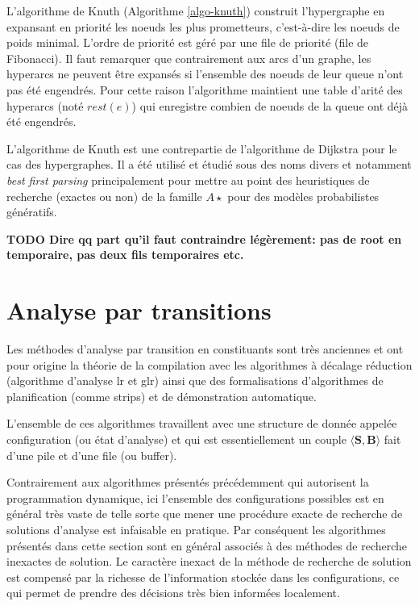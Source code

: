 \documentclass[11pt,openany]{book}
\begin{document}
L'algorithme de Knuth (Algorithme \ref{algo-knuth}) construit l'hypergraphe en expansant en priorité 
les noeuds les plus prometteurs, c'est-à-dire les noeuds de poids minimal.
L'ordre de priorité est géré par une file de priorité (file de Fibonacci).
Il faut remarquer que contrairement aux arcs d'un graphe, les hyperarcs ne peuvent être expansés 
si l'ensemble des noeuds de leur queue n'ont pas été engendrés. Pour cette raison l'algorithme maintient une table d'arité des hyperarcs
(noté $rest(e)$) qui enregistre combien de noeuds de la queue ont déjà été engendrés.

L'algorithme de Knuth est une contrepartie de l'algorithme de Dijkstra 
pour le cas des hypergraphes. Il a été utilisé et étudié sous des noms divers et notamment
{\em best first parsing} principalement 
pour mettre au point des heuristiques de recherche (exactes ou non) 
de la famille $A\star$ pour des modèles probabilistes génératifs.


{\bf TODO Dire qq part qu'il faut contraindre légèrement:  pas de root en temporaire, pas deux fils temporaires etc.}
\section{Analyse par transitions}

Les méthodes d’analyse par transition en constituants sont très anciennes
et ont pour origine la théorie de la compilation avec les algorithmes à décalage réduction (algorithme d'analyse {\sc lr} et {\sc glr})
ainsi que des formalisations d’algorithmes de planification (comme {\sc strips}) et de démonstration automatique.

L’ensemble de ces algorithmes travaillent avec une structure de donnée 
appelée configuration (ou état d'analyse) et qui est essentiellement un couple 
$\langle \mathbf{S},\mathbf{B} \rangle$ fait d’une pile et d’une file (ou buffer). 

Contrairement aux algorithmes présentés précédemment qui autorisent la programmation dynamique, ici
l’ensemble des configurations possibles est en général très vaste de telle sorte que mener une procédure exacte de recherche de solutions 
d’analyse est infaisable en pratique. Par conséquent les algorithmes présentés dans cette section sont en général 
associés à des méthodes de recherche inexactes de solution. 
Le caractère inexact de la méthode de recherche de solution est compensé 
par la richesse de l’information stockée dans les configurations, ce qui permet de prendre des décisions très bien informées localement.
\end{document}
